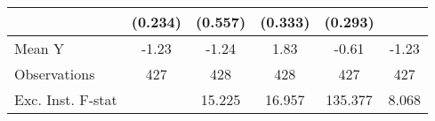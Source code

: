 {\begin{tabular}{l*{5}{c}}
            &     (0.234)         &     (0.557)         &     (0.333)         &     (0.293)         &                     \\
\midrule
Mean Y      &       -1.23         &       -1.24         &        1.83         &       -0.61         &       -1.23         \\
Observations&         427         &         428         &         428         &         427         &         427         \\
Exc. Inst. F-stat&                     &      15.225         &      16.957         &     135.377         &       8.068         \\
\bottomrule
\end{tabular}
}

